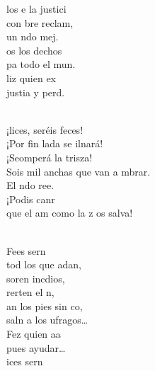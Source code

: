 \documentclass[12pt]{article}
\begin{document}
\begin{multicols*}{2}
\begin{cancion}
            los e la justici\\
            con bre reclam,\\
            un ndo mej.\\
            os los dechos\\
            pa todo el mun.\\
            liz quien ex\\
            justia y perd. \\\jump\\
            \begin{chorus}%
            ¡lices, seréis feces! \\
            ¡Por fin lada se ilnará!\\
            ¡Seomperá la trisza!\\
            Sois mil anchas que van a mbrar.\\
            El ndo ree.\\
            ¡Podis canr\\
            que el am como la z os salva!\\
            \end{chorus}%
            \jump\\
            Fees sern\\
            tod los que adan,\\
            soren incdios,\\
            rerten el n,\\
            an los pies sin co,\\
            saln a los ufragos… \\
            Fez quien aa\\
            pues  ayudar…\\
        \jump
            ices sern\\

\end{cancion}
\end{multicols*}
\end{document}
